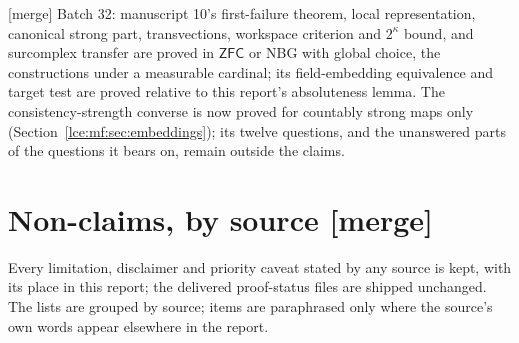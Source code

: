 \documentclass[11pt,letterpaper]{article}
\numberwithin{equation}{section}
\theoremstyle{definition}
\theoremstyle{remark}
\newcommand{\ZFC}{\mathsf{ZFC}}
\newcommand{\mergetag}{\textup{\textsf{\small[merge]}}}%
\begin{document}
\mergetag{} Batch 32: manuscript 10's first-failure theorem, local
representation, canonical strong part, transvections, workspace criterion
and $2^\kappa$ bound, and surcomplex transfer are proved in $\ZFC$ or NBG
with global choice, the constructions under a measurable cardinal; its
field-embedding equivalence and target test are proved relative to this
report's absoluteness lemma. The consistency-strength converse is now
proved for countably strong maps only
(Section~\ref{lce:mf:sec:embeddings}); its twelve questions, and the
unanswered parts of the questions it bears on, remain outside the claims.

\section{Non-claims, by source \mergetag}\label{lce:app:nonclaims}
Every limitation, disclaimer and priority caveat stated by any source is
kept, with its place in this report; the delivered proof-status files are
shipped unchanged. The lists are grouped by source; items are paraphrased
only where the source's own words appear elsewhere in the report.
\end{document}
